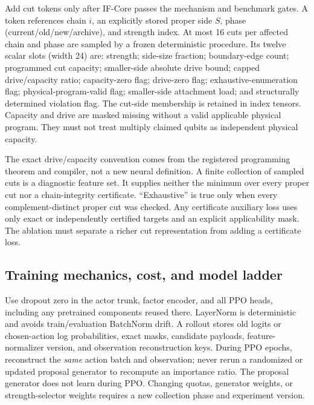 Add cut tokens only after IF-Core passes the mechanism and benchmark gates. A token references chain \(i\), an explicitly stored proper side \(S\), phase (current/old/new/archive), and strength index. At most 16 cuts per affected chain and phase are sampled by a frozen deterministic procedure. Its twelve scalar slots (width 24) are: strength; side-size fraction; boundary-edge count; programmed cut capacity; smaller-side absolute drive bound; capped drive/capacity ratio; capacity-zero flag; drive-zero flag; exhaustive-enumeration flag; physical-program-valid flag; smaller-side attachment load; and structurally determined violation flag. The cut-side membership is retained in index tensors. Capacity and drive are masked missing without a valid applicable physical program. They must not treat multiply claimed qubits as independent physical capacity.

The exact drive/capacity convention comes from the registered programming theorem and compiler, not a new neural definition. A finite collection of sampled cuts is a diagnostic feature set. It supplies neither the minimum over every proper cut nor a chain-integrity certificate. ``Exhaustive'' is true only when every complement-distinct proper cut was checked. Any certificate auxiliary loss uses only exact or independently certified targets and an explicit applicability mask. The ablation must separate a richer cut representation from adding a certificate loss.

\subsection{Training mechanics, cost, and model ladder}

Use dropout zero in the actor trunk, factor encoder, and all PPO heads, including any pretrained components reused there. LayerNorm is deterministic and avoids train/evaluation BatchNorm drift. A rollout stores old logits or chosen-action log probabilities, exact masks, candidate payloads, feature-normalizer version, and observation reconstruction keys. During PPO epochs, reconstruct the \emph{same} action batch and observation; never rerun a randomized or updated proposal generator to recompute an importance ratio. The proposal generator does not learn during PPO. Changing quotas, generator weights, or strength-selector weights requires a new collection phase and experiment version.

